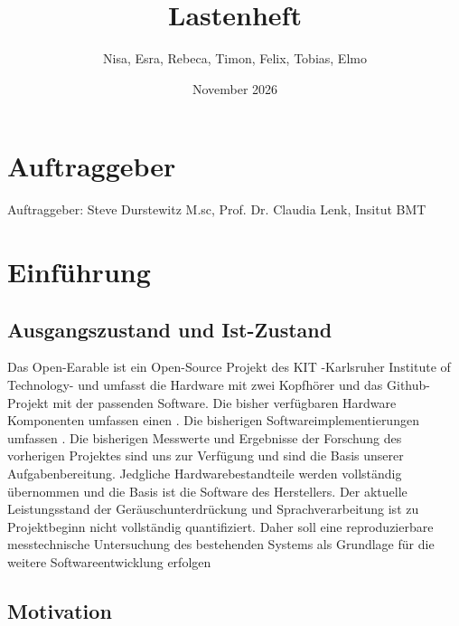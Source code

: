 \documentclass{article}
\title{Lastenheft}
\author{Nisa, Esra, Rebeca, Timon, Felix, Tobias, Elmo}
\date{November 2026}
\begin{document}
\maketitle
 

\section{Auftraggeber}
Auftraggeber: Steve Durstewitz M.sc, Prof. Dr. Claudia Lenk, Insitut BMT 


\section{Einführung}
\subsection{Ausgangszustand und Ist-Zustand}
Das Open-Earable ist ein Open-Source Projekt des KIT -Karlsruher Institute of Technology- und umfasst die Hardware mit zwei Kopfhörer und das Github-Projekt mit der passenden Software. Die bisher verfügbaren Hardware Komponenten umfassen einen . Die bisherigen Softwareimplementierungen umfassen . 
Die bisherigen Messwerte und Ergebnisse der Forschung des vorherigen Projektes sind uns zur Verfügung und sind die Basis unserer Aufgabenbereitung. 
Jedgliche Hardwarebestandteile werden vollständig übernommen und die Basis ist die Software des Herstellers.
Der aktuelle Leistungsstand der Geräuschunterdrückung und Sprachverarbeitung ist zu Projektbeginn nicht vollständig quantifiziert. Daher soll eine reproduzierbare messtechnische Untersuchung des bestehenden Systems als Grundlage für die weitere Softwareentwicklung erfolgen


\subsection{Motivation}
\end{document}
